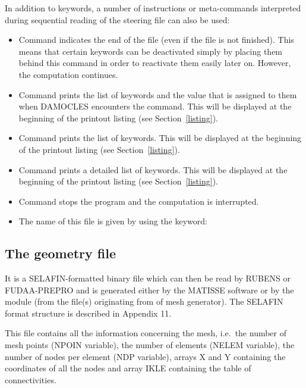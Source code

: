 
In addition to keywords, a number of instructions or meta-commands interpreted during sequential reading of the steering file can also be used:

\begin{itemize}
\item  Command  indicates the end of the file (even if the file
  is not finished). This means that certain keywords can be deactivated simply
    by placing them behind this command in order to reactivate them easily
    later on. However, the computation continues.

\item  Command  prints the list of keywords and the value that is
  assigned to them when DAMOCLES encounters the command. This will be displayed
    at the beginning of the printout listing (see Section~\ref{listing}).

\item  Command  prints the list of keywords. This will be
  displayed at the beginning of the printout listing (see Section~\ref{listing}).

\item  Command  prints a detailed list of keywords. This will be
  displayed at the beginning of the printout listing (see Section~\ref{listing}).

\item  Command  stops the program and the computation is
  interrupted.

\item  The name of this file is given by using the keyword:
\end{itemize}


\subsection{The geometry file}

It is a SELAFIN-formatted binary file which can then be read by RUBENS or
FUDAA-PREPRO and is generated either by the MATISSE software or by the
\stbtel{} module (from the file(s) originating from of mesh generator). The
SELAFIN format structure is described in Appendix 11.

This file contains all the information concerning the mesh, i.e.\ the number of
mesh points (NPOIN variable), the number of elements (NELEM variable), the
number of nodes per element (NDP variable), arrays X and Y containing the
coordinates of all the nodes and array IKLE containing the table of
connectivities.

